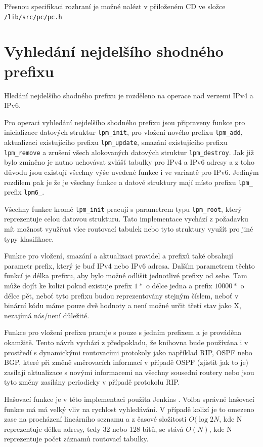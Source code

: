Přesnou specifikaci rozhraní je možné nalézt v přiloženém CD ve složce \texttt{/lib/src/pc/pc.h}


\section{Vyhledání nejdelšího shodného prefixu}

Hledání nejdelšího shodného prefixu je rozděleno na operace nad verzemi IPv4 a IPv6.

Pro operaci vyhledání nejdelšího shodného prefixu jsou připraveny funkce pro inicializace datových struktur
\texttt{lpm\_init}, pro vložení nového prefixu \texttt{lpm\_add}, aktualizaci existujícího prefixu
\texttt{lpm\_update}, smazání existujícího prefixu \texttt{lpm\_remove} a zrušení všech alokovaných
datových struktur \texttt{lpm\_destroy}. Jak již bylo zmíněno je nutno uchovávat zvlášť tabulky
pro IPv4 a IPv6 adresy a z toho důvodu jsou existují všechny výše uvedené funkce i ve variantě
pro IPv6. Jediným rozdílem pak je že je všechny funkce a datové struktury mají místo prefixu
\texttt{lpm\_} prefix \texttt{lpm6\_}.

Všechny funkce kromě \texttt{lpm\_init} pracují s parametrem typu \texttt{lpm\_root}, který reprezentuje
celou datovou strukturu. Tato implementace vychází z požadavku mít možnost využívat více routovací
tabulek nebo tyto struktury využít pro jiné typy klasifikace.

Funkce pro vložení, smazání a aktualizaci pravidel a prefixů také obsahují parametr
prefix, který je buď IPv4 nebo IPv6 adresa. Dalším parametrem těchto funkcí je délka prefixu,
aby bylo možné odlišit jednotlivé prefixy od sebe. Tam může dojít ke kolizi pokud existuje
prefix $1*$ o délce jedna a prefix $10000*$ o délce pět, neboť tyto prefixu budou reprezentovány stejným
číslem, neboť v binární kódu máme pouze dvě hodnoty a není možné určit třetí stav jako X,
nezajímá nás/není důležité.

Funkce pro vložení prefixu pracuje s pouze s jedním prefixem a je prováděna okamžitě.
Tento návrh vychází z předpokladu, že knihovna bude používána i v prostředí s dynamickými routovacími
protokoly jako například RIP, OSPF nebo BGP, které při změně směrovacích informací v případě OSPF (zjistit jak to je)
zasílají aktualizace s novými informacemi na všechny sousední routery nebo jsou tyto změny zasílány periodicky
v případě protokolu RIP.

Hašovací funkce je v této implementaci použita Jenkins \cite{jenkins}. Volba správné hašovací funkce
má má velký vliv na rychlost vyhledávání. V případě kolizí je to omezeno zase na procházení lineárního
seznamu a z časové složitosti $O(\log{2}{N}$, kde N reprezentuje délku adresy, tedy 32 nebo 128 bitů,
se stává $O(N)$, kde N reprezentuje počet záznamů routovací tabulky.

